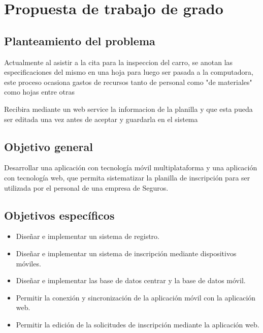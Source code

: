 \chapter{Propuesta de trabajo de grado}

\section{Planteamiento del problema}


Actualmente al asistir a la cita para la inspeccion del carro, se anotan las especificaciones del mismo en una hoja para luego ser pasada a la computadora, este proceso ocasiona gastos de recursos tanto de personal como "de materiales" como hojas entre otras  

Recibira mediante un web service la informacion de la planilla y que esta pueda ser editada una vez antes de aceptar y guardarla en el sistema

\section{Objetivo general}

Desarrollar una aplicación con tecnología móvil multiplataforma y una aplicación con tecnología web, que permita sistematizar la planilla de inscripción para ser utilizada por el personal de una empresa de Seguros. 

\section{Objetivos específicos}

\begin{itemize}

	\item Diseñar e implementar un sistema de registro.
	
	\item Diseñar e implementar un sistema de inscripción mediante dispositivos móviles.
	
	\item Diseñar e implementar las base de datos centrar y la base de datos móvil.
	
	\item Permitir la conexión y sincronización de la aplicación móvil con la aplicación web.
	
	\item Permitir la edición de la solicitudes de inscripción mediante la aplicación web.
	
	

\end{itemize}

